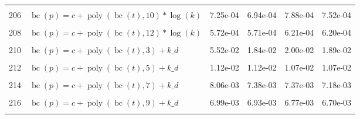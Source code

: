 \documentclass[12pt,a4paper]{article}
\DeclareMathOperator{\bc}{bc}
\DeclareMathOperator{\poly}{poly}
\begin{document}
\begin{longtable}[t]{ll>{\raggedleft\arraybackslash}p{2cm}>{\raggedleft\arraybackslash}p{2cm}>{\raggedleft\arraybackslash}p{2cm}>{\raggedleft\arraybackslash}p{2cm}}
\cellcolor{gray!6}{205} & \cellcolor{gray!6}{$\bc(p) = c + \poly\left( \bc(t), 9 \right) * \log(k)$} & \cellcolor{gray!6}{1.90e-03} & \cellcolor{gray!6}{1.76e-03} & \cellcolor{gray!6}{2.05e-03} & \cellcolor{gray!6}{1.89e-03}\\
206 & $\bc(p) = c + \poly\left( \bc(t), 10 \right) * \log(k)$ & 7.25e-04 & 6.94e-04 & 7.88e-04 & 7.52e-04\\
\cellcolor{gray!6}{207} & \cellcolor{gray!6}{$\bc(p) = c + \poly\left( \bc(t), 11 \right) * \log(k)$} & \cellcolor{gray!6}{7.32e-04} & \cellcolor{gray!6}{6.95e-04} & \cellcolor{gray!6}{7.98e-04} & \cellcolor{gray!6}{7.56e-04}\\
208 & $\bc(p) = c + \poly\left( \bc(t), 12 \right) * \log(k)$ & 5.72e-04 & 5.71e-04 & 6.21e-04 & 6.20e-04\\
\cellcolor{gray!6}{209} & \cellcolor{gray!6}{$\bc(p) = c + \poly\left( \bc(t), 13 \right) * \log(k)$} & \cellcolor{gray!6}{5.68e-04} & \cellcolor{gray!6}{5.64e-04} & \cellcolor{gray!6}{6.25e-04} & \cellcolor{gray!6}{6.20e-04}\\
210 & $\bc(p) = c + \poly\left( \bc(t), 3 \right) + k\_d$ & 5.52e-02 & 1.84e-02 & 2.00e-02 & 1.89e-02\\
\cellcolor{gray!6}{211} & \cellcolor{gray!6}{$\bc(p) = c + \poly\left( \bc(t), 4 \right) + k\_d$} & \cellcolor{gray!6}{2.34e-02} & \cellcolor{gray!6}{2.20e-02} & \cellcolor{gray!6}{2.43e-02} & \cellcolor{gray!6}{2.35e-02}\\
212 & $\bc(p) = c + \poly\left( \bc(t), 5 \right) + k\_d$ & 1.12e-02 & 1.12e-02 & 1.07e-02 & 1.07e-02\\
\cellcolor{gray!6}{213} & \cellcolor{gray!6}{$\bc(p) = c + \poly\left( \bc(t), 6 \right) + k\_d$} & \cellcolor{gray!6}{9.61e-03} & \cellcolor{gray!6}{8.66e-03} & \cellcolor{gray!6}{9.86e-03} & \cellcolor{gray!6}{8.69e-03}\\
214 & $\bc(p) = c + \poly\left( \bc(t), 7 \right) + k\_d$ & 8.06e-03 & 7.38e-03 & 7.37e-03 & 7.18e-03\\
\cellcolor{gray!6}{215} & \cellcolor{gray!6}{$\bc(p) = c + \poly\left( \bc(t), 8 \right) + k\_d$} & \cellcolor{gray!6}{6.92e-03} & \cellcolor{gray!6}{6.89e-03} & \cellcolor{gray!6}{6.68e-03} & \cellcolor{gray!6}{6.64e-03}\\
216 & $\bc(p) = c + \poly\left( \bc(t), 9 \right) + k\_d$ & 6.99e-03 & 6.93e-03 & 6.77e-03 & 6.70e-03\\
\cellcolor{gray!6}{217} & \cellcolor{gray!6}{$\bc(p) = c + \poly\left( \bc(t), 10 \right) + k\_d$} & \cellcolor{gray!6}{6.73e-03} & \cellcolor{gray!6}{6.72e-03} & \cellcolor{gray!6}{6.46e-03} & \cellcolor{gray!6}{6.45e-03}\\

\end{longtable}
\end{document}
